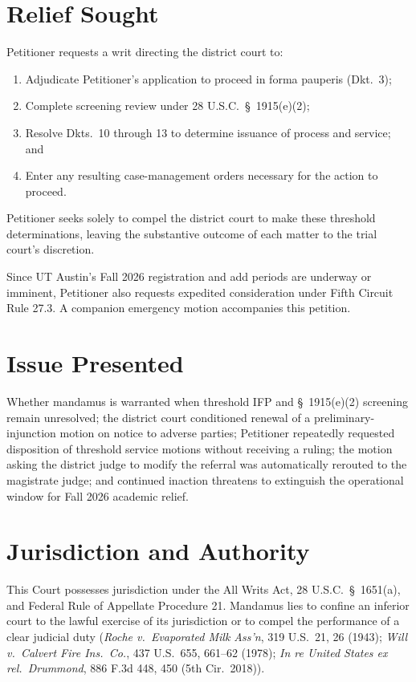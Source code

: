 \documentclass[14pt]{extarticle}
\begin{document}
\section*{Relief Sought}

Petitioner requests a writ directing the district court to:

\begin{enumerate}
\item Adjudicate Petitioner's application to proceed in forma pauperis (Dkt.\ 3);
\item Complete screening review under 28 U.S.C.\ \S\ 1915(e)(2);
\item Resolve Dkts.\ 10 through 13 to determine issuance of process and service; and
\item Enter any resulting case-management orders necessary for the action to proceed.
\end{enumerate}

Petitioner seeks solely to compel the district court to make these threshold determinations, leaving the substantive outcome of each matter to the trial court's discretion.

Since UT Austin's Fall 2026 registration and add periods are underway or imminent, Petitioner also requests expedited consideration under Fifth Circuit Rule 27.3. A companion emergency motion accompanies this petition.

\section*{Issue Presented}

Whether mandamus is warranted when threshold IFP and \S\ 1915(e)(2) screening remain unresolved; the district court conditioned renewal of a preliminary-injunction motion on notice to adverse parties; Petitioner repeatedly requested disposition of threshold service motions without receiving a ruling; the motion asking the district judge to modify the referral was automatically rerouted to the magistrate judge; and continued inaction threatens to extinguish the operational window for Fall 2026 academic relief.

\section*{Jurisdiction and Authority}

This Court possesses jurisdiction under the All Writs Act, 28 U.S.C.\ \S\ 1651(a), and Federal Rule of Appellate Procedure 21. Mandamus lies to confine an inferior court to the lawful exercise of its jurisdiction or to compel the performance of a clear judicial duty (\textit{Roche v.\ Evaporated Milk Ass'n}, 319 U.S.\ 21, 26 (1943); \textit{Will v.\ Calvert Fire Ins.\ Co.}, 437 U.S.\ 655, 661--62 (1978); \textit{In re United States ex rel.\ Drummond}, 886 F.3d 448, 450 (5th Cir.\ 2018)).
\end{document}
